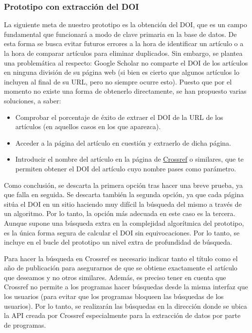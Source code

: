\subsubsection{Prototipo con extracción del DOI}

La siguiente meta de nuestro prototipo es la obtención del DOI, que es un campo fundamental que funcionará a modo de clave primaria en la base de datos. De esta forma se busca evitar futuros errores a la hora de identificar un artículo o a la hora de comparar artículos para eliminar duplicados. Sin embargo, se plantea una problemática al respecto: Google Scholar no comparte el DOI de los artículos en ninguna división de su página web (si bien es cierto que algunos artículos lo incluyen al final de su URL, pero no siempre ocurre esto). Puesto que por el momento no existe una forma de obtenerlo directamente, se han propuesto varias soluciones, a saber:
\begin{itemize}
	\item Comprobar el porcentaje de éxito de extraer el DOI de la URL de los artículos (en aquellos casos en los que aparezca).
	\item Acceder a la página del artículo en cuestión y extraerlo de dicha página.
         \item Introducir el nombre del artículo en la página de \href{https://www.crossref.org/}{Crossref} o similares, que te permiten obtener el DOI del artículo cuyo nombre pases como parámetro.
\end{itemize}
Como conclusión, se descarta la primera opción tras hacer una breve prueba, ya que falla en seguida. Se descarta también la segunda opción, ya que cada página sitúa el DOI en un sitio haciendo muy difícil la búsqueda del mismo a través de un algoritmo. Por lo tanto, la opción más adecuada en este caso es la tercera. Aunque supone una búsqueda extra en la complejidad algorítmica del prototipo, es la única forma segura de calcular el DOI sin equivocaciones. Por lo tanto, se incluye en el bucle del prototipo un nivel extra de profundidad de búsqueda.

Para hacer la búsqueda en Crossref es necesario indicar tanto el título como el año de publicación para asegurarnos de que se obtiene exactamente el artículo que deseamos y no otros similares. Además, es preciso tener en cuenta que Crossref no permite a los programas hacer búsquedas desde la misma interfaz que los usuarios (para evitar que los programas bloqueen las búsquedas de los usuarios). Por lo tanto, se realizarán las búsquedas en la dirección donde se ubica la API creada por Crossref especialmente para la extracción de datos por parte de programas.

